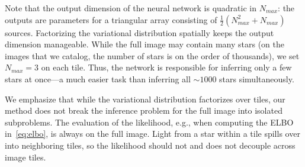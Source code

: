 Note that the output dimension of the neural network is quadratic in $N_{max}$: the outputs are parameters for a triangular array consisting of $\frac{1}{2}(N_{max}^2 + N_{max})$ sources.
Factorizing the variational distribution spatially keeps the output dimension manageable.
While the full image may contain many stars
(on the images that we catalog, the number of stars is on the order of thousands),
we set $N_{max} = 3$ on each tile.
Thus, the network is responsible for inferring only a few stars at once---a much easier task than inferring all $\sim1000$ stars simultaneously.

We emphasize that while the variational distribution factorizes over tiles, our method does not break the inference problem for the full image into isolated subproblems. The evaluation of the likelihood, e.g., when computing the ELBO in~\eqref{eq:elbo}, is always on the full image. Light from a star within a tile spills over into neighboring tiles, so the likelihood should not and does not decouple across image tiles.
